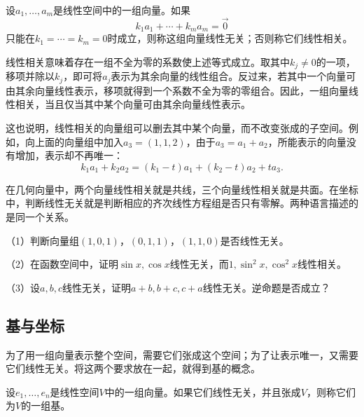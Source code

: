 \begin{definition}\label{def:linindep}
设\(a_{1} , \ldots , a_{m}\)是线性空间中的一组向量。如果
\begin{equation}
    k_{1} a_{1} + \cdots + k_{m} a_{m} = \vec{0}
\end{equation}
只能在\(k_{1} = \cdots = k_{m} = 0\)时成立，则称这组向量线性无关；否则称它们线性相关。
\end{definition}

线性相关意味着存在一组不全为零的系数使上述等式成立。取其中\(k_{j} \ne 0\)的一项，移项并除以\(k_{j}\)，即可将\(a_{j}\)表示为其余向量的线性组合。反过来，若其中一个向量可由其余向量线性表示，移项就得到一个系数不全为零的零组合。因此，一组向量线性相关，当且仅当其中某个向量可由其余向量线性表示。

这也说明，线性相关的向量组可以删去其中某个向量，而不改变张成的子空间。例如，向上面的向量组中加入\(a_{3} = \left( 1 , 1 , 2 \right)\)，由于\(a_{3} = a_{1} + a_{2}\)，所能表示的向量没有增加，表示却不再唯一：
\begin{equation}
    k_{1} a_{1} + k_{2} a_{2}
    = \left( k_{1} - t \right) a_{1} + \left( k_{2} - t \right) a_{2} + t a_{3} .
\end{equation}

在几何向量中，两个向量线性相关就是共线，三个向量线性相关就是共面。在坐标中，判断线性无关就是判断相应的齐次线性方程组是否只有零解。两种语言描述的是同一个关系。

\begin{example}
（1）判断向量组\(\left( 1 , 0 , 1 \right)\)，\(\left( 0 , 1 , 1 \right)\)，\(\left( 1 , 1 , 0 \right)\)是否线性无关。

（2）在函数空间中，证明\(\sin x , \cos x\)线性无关，而\(1 , \sin^{2} x , \cos^{2} x\)线性相关。

（3）设\(a , b , c\)线性无关，证明\(a + b , b + c , c + a\)线性无关。逆命题是否成立？
\end{example}

\subsection{基与坐标}
为了用一组向量表示整个空间，需要它们张成这个空间；为了让表示唯一，又需要它们线性无关。将这两个要求放在一起，就得到基的概念。

\begin{definition}\label{def:basis}
设\(e_{1} , \ldots , e_{n}\)是线性空间\(V\)中的一组向量。如果它们线性无关，并且张成\(V\)，则称它们为\(V\)的一组基。
\end{definition}

